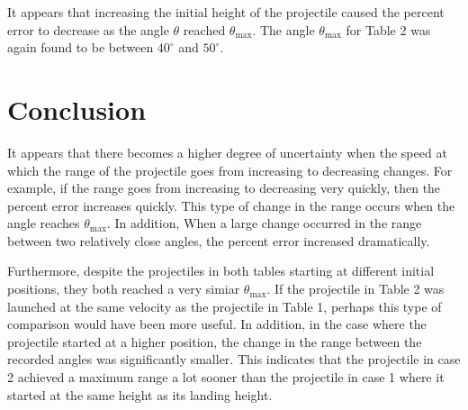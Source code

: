 \documentclass[12pt]{article}
\begin{document}
It appears that increasing the initial height of the projectile caused the percent error to decrease as the angle $\theta $ reached $\theta_\text{max}$. The angle $\theta_\text{max}$ for Table 2 was again found to be between $40^\circ$ and $50^\circ$.
\section{Conclusion}
It appears that there becomes a higher degree of uncertainty when the speed at which the range of the projectile goes from increasing to decreasing changes. For example, if the range goes from increasing to decreasing very quickly, then the percent error increases quickly. This type of change in the range occurs when the angle reaches $\theta_\text{max}$. In addition, When a large change occurred in the range between two relatively close angles, the percent error increased dramatically.

Furthermore, despite the projectiles in both tables starting at different initial positions, they both reached a very simiar $\theta_\text{max}$. If the projectile in Table 2 was launched at the same velocity as the projectile in Table 1, perhaps this type of comparison would have been more useful. In addition, in the case where the projectile started at a higher position, the change in the range between the recorded angles was significantly smaller. This indicates that the projectile in case 2 achieved a maximum range a lot sooner than the projectile in case 1 where it started at the same height as its landing height.
\end{document}
